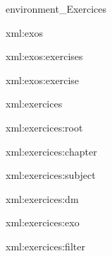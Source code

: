 \startenvironment environment_Exercices
\unprotect


\startxmlsetups xml:exos
\stopxmlsetups
{}

\startxmlsetups xml:exos:exercises
\stopxmlsetups

\startxmlsetups xml:exos:exercise
\stopxmlsetups


\startxmlsetups xml:exercices
\stopxmlsetups 


\startxmlsetups xml:exercices:root
%
\stopxmlsetups

\startxmlsetups xml:exercices:chapter
%
\stopxmlsetups

\startxmlsetups xml:exercices:subject
%
\stopxmlsetups


\startxmlsetups xml:exercices:dm
\startsection[title=DM]
%
\stopsection
\stopxmlsetups


\startxmlsetups xml:exercices:exo
%
\stopxmlsetups

\startxmlsetups xml:exercices:filter
\stopxmlsetups


\iffalse
\startxmlsetups xml:exos
\xmlsetsetup{exo}{*}{-}
\xmlsetsetup{exo}{exercises|exercise}{xml:*}
\stopxmlsetups 

\xmlregistersetup{xml:exos} 



\startxmlsetups xml:exercises
\xmlflush{#1}%
\stopxmlsetups

\startxmlsetups xml:exercise
\ctxlua{L.infernoRemember("#1")}
\stopxmlsetups
\fi

\protect
\stopenvironment
